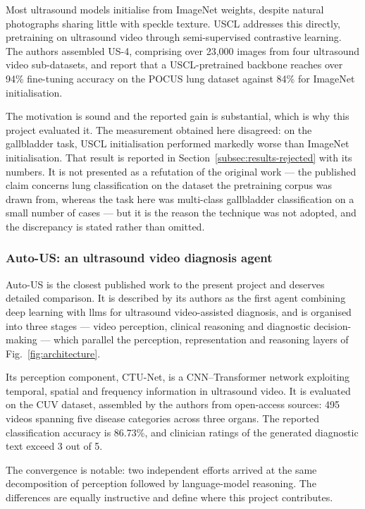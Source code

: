 Most ultrasound models initialise from ImageNet weights, despite natural photographs
sharing little with speckle texture. USCL \cite{chen2021uscl} addresses this directly,
pretraining on ultrasound video through semi-supervised contrastive learning. The authors
assembled US-4, comprising over 23{,}000 images from four ultrasound video sub-datasets,
and report that a USCL-pretrained backbone reaches over 94\% fine-tuning accuracy on the
POCUS lung dataset against 84\% for ImageNet initialisation.

The motivation is sound and the reported gain is substantial, which is why this project
evaluated it. The measurement obtained here disagreed: on the gallbladder task, USCL
initialisation performed markedly worse than ImageNet initialisation. That result is
reported in Section~\ref{subsec:results-rejected} with its numbers. It is not presented as
a refutation of the original work --- the published claim concerns lung classification on
the dataset the pretraining corpus was drawn from, whereas the task here was multi-class
gallbladder classification on a small number of cases --- but it is the reason the
technique was not adopted, and the discrepancy is stated rather than omitted.

\subsubsection{Auto-US: an ultrasound video diagnosis agent}

Auto-US \cite{yang2025autous} is the closest published work to the present project and
deserves detailed comparison. It is described by its authors as the first agent combining
deep learning with \glspl{llm} for ultrasound video-assisted diagnosis, and is organised
into three stages --- video perception, clinical reasoning and diagnostic decision-making
--- which parallel the perception, representation and reasoning layers of
Fig.~\ref{fig:architecture}.

Its perception component, CTU-Net, is a CNN--Transformer network exploiting temporal,
spatial and frequency information in ultrasound video. It is evaluated on the CUV dataset,
assembled by the authors from open-access sources: 495 videos spanning five disease
categories across three organs. The reported classification accuracy is 86.73\%, and
clinician ratings of the generated diagnostic text exceed 3 out of 5.

The convergence is notable: two independent efforts arrived at the same decomposition of
perception followed by language-model reasoning. The differences are equally instructive
and define where this project contributes.

